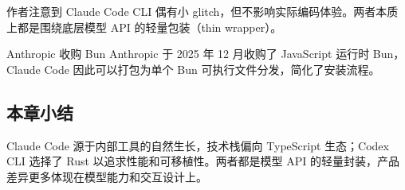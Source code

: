 作者注意到 Claude Code CLI 偶有小 glitch，但不影响实际编码体验。两者本质上都是围绕底层模型 API 的轻量包装（thin wrapper）。

\begin{knowledgebox}{Anthropic 收购 Bun}
Anthropic 于 2025 年 12 月收购了 JavaScript 运行时 Bun，Claude Code 因此可以打包为单个 Bun 可执行文件分发，简化了安装流程。
\end{knowledgebox}

\subsection{本章小结}

Claude Code 源于内部工具的自然生长，技术栈偏向 TypeScript 生态；Codex CLI 选择了 Rust 以追求性能和可移植性。两者都是模型 API 的轻量封装，产品差异更多体现在模型能力和交互设计上。

